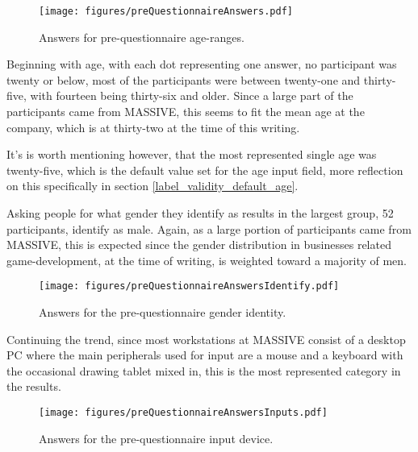     \begin{figure}[h!]
      \centering
      \texttt{[image: figures/preQuestionnaireAnswers.pdf]}
      \caption{Answers for pre-questionnaire age-ranges.}
    \end{figure}

    Beginning with age, with each dot representing one answer, no
    participant was twenty or below, most of the  participants were between
    twenty-one and thirty-five, with fourteen being thirty-six and older.
    Since a large part of the participants came from MASSIVE, this seems to
    fit the mean age at the company, which is at thirty-two at
    the time of this writing.

    It's is worth mentioning however, that the most represented single age
    was twenty-five, which is the default value set for the age input
    field, more reflection on this specifically in section
    \ref{label_validity_default_age}.

    \newpage
    Asking people for what gender they identify as results in the largest
    group, 52 participants, identify as male. Again, as a large portion of
    participants came from MASSIVE, this is expected since the gender
    distribution in businesses related game-development, at the time of
    writing, is weighted toward a majority of men\cite[p.16]{citeIndex2019}.

    \vspace{-0.4cm}
    \begin{figure}[h!]
      \centering
      \texttt{[image: figures/preQuestionnaireAnswersIdentify.pdf]}
      \vspace{-0.2cm}
      \caption{Answers for the pre-questionnaire gender identity.}
    \end{figure}

    \vspace{-0.2cm}
    Continuing the trend, since most workstations at MASSIVE consist of a
    desktop PC where the main peripherals used for input are a mouse and a
    keyboard with the occasional drawing tablet mixed in, this is the most
    represented category in the results.

    \vspace{-0.4cm}
    \begin{figure}[h!]
      \centering
      \texttt{[image: figures/preQuestionnaireAnswersInputs.pdf]}
      \vspace{-0.2cm}
      \caption{Answers for the pre-questionnaire input device.}
    \end{figure}

